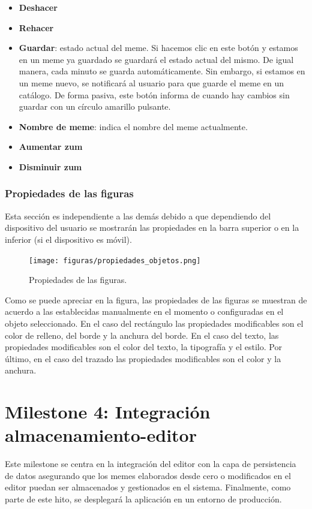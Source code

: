 \begin{itemize}
    \item \textbf{Deshacer}
    \item \textbf{Rehacer}
    \item \textbf{Guardar}: estado actual del meme. Si hacemos clic en este botón y estamos en un meme ya guardado se guardará el estado actual del mismo. De igual manera, cada minuto se guarda automáticamente. Sin embargo, si estamos en un meme nuevo, se notificará al usuario para que guarde el meme en un catálogo. De forma pasiva, este botón informa de cuando hay cambios sin guardar con un círculo amarillo pulsante.
    \item \textbf{Nombre de meme}: indica el nombre del meme actualmente.
    \item \textbf{Aumentar zum}
    \item \textbf{Disminuir zum}
\end{itemize}

\subsubsection{Propiedades de las figuras}

Esta sección es independiente a las demás debido a que dependiendo del dispositivo del usuario se mostrarán las propiedades en la barra superior o en la inferior (si el dispositivo es móvil).

\begin{figure}[H]
    \caption{Propiedades de las figuras.}
    \centering
    \vspace*{0.5cm}
    \texttt{[image: figuras/propiedades\_objetos.png]}
\end{figure}

Como se puede apreciar en la figura, las propiedades de las figuras se muestran de acuerdo a las establecidas manualmente en el momento o configuradas en el objeto seleccionado. En el caso del rectángulo las propiedades modificables son el color de relleno, del borde y la anchura del borde. En el caso del texto, las propiedades modificables son el color del texto, la tipografía y el estilo. Por último, en el caso del trazado las propiedades modificables son el color y la anchura.

\section{Milestone 4: Integración almacenamiento-editor}

Este milestone se centra en la integración del editor con la capa de persistencia de datos asegurando que los memes elaborados desde cero o modificados en el editor puedan ser almacenados y gestionados en el sistema. Finalmente, como parte de este hito, se desplegará la aplicación en un entorno de producción.

